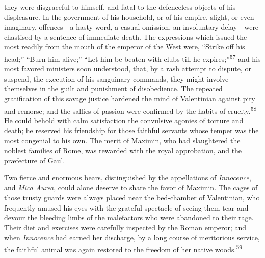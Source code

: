 they were disgraceful to himself, and fatal to the defenceless
objects of his displeasure. In the government of his household,
or of his empire, slight, or even imaginary, offences—a hasty
word, a casual omission, an involuntary delay—were chastised by a
sentence of immediate death. The expressions which issued the
most readily from the mouth of the emperor of the West were,
“Strike off his head;” “Burn him alive;” “Let him be beaten with
clubs till he expires;”\textsuperscript{57} and his most favored ministers soon
understood, that, by a rash attempt to dispute, or suspend, the
execution of his sanguinary commands, they might involve
themselves in the guilt and punishment of disobedience. The
repeated gratification of this savage justice hardened the mind
of Valentinian against pity and remorse; and the sallies of
passion were confirmed by the habits of cruelty.\textsuperscript{58} He could
behold with calm satisfaction the convulsive agonies of torture
and death; he reserved his friendship for those faithful servants
whose temper was the most congenial to his own. The merit of
Maximin, who had slaughtered the noblest families of Rome, was
rewarded with the royal approbation, and the præfecture of Gaul.

Two fierce and enormous bears, distinguished by the appellations
of \textit{Innocence}, and \textit{Mica Aurea}, could alone deserve to share
the favor of Maximin. The cages of those trusty guards were
always placed near the bed-chamber of Valentinian, who frequently
amused his eyes with the grateful spectacle of seeing them tear
and devour the bleeding limbs of the malefactors who were
abandoned to their rage. Their diet and exercises were carefully
inspected by the Roman emperor; and when \textit{Innocence} had earned
her discharge, by a long course of meritorious service, the
faithful animal was again restored to the freedom of her native
woods.\textsuperscript{59}



